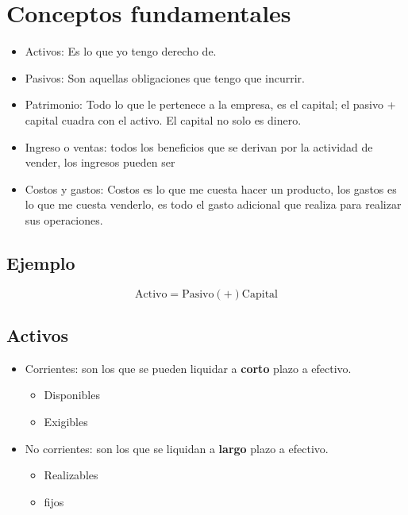 \section{Conceptos fundamentales}
\begin{itemize}
    \item Activos: Es lo que yo tengo derecho de.
    \item Pasivos: Son aquellas obligaciones que tengo que incurrir.
    \item Patrimonio: Todo lo que le pertenece a la empresa, es el capital; el pasivo + capital cuadra con el activo. El capital no solo es dinero. 
    \item Ingreso o ventas: todos los beneficios que se derivan por la actividad de vender, los ingresos pueden ser 
    \item Costos y gastos: Costos es lo que me cuesta hacer un producto, los gastos es lo que me cuesta venderlo, es todo el gasto adicional que realiza para realizar sus operaciones.
\end{itemize}

\subsection{Ejemplo}
\[
  \text{Activo} = \text{Pasivo} (+) \text{Capital} 
\]

\subsection{Activos}
\begin{itemize}
    \item Corrientes: son los que se pueden liquidar a \textbf{corto} plazo a efectivo.
        \begin{itemize}
            \item Disponibles 
            \item Exigibles
        \end{itemize}
    \item No corrientes: son los que se liquidan a \textbf{largo} plazo a efectivo. 
        \begin{itemize}
            \item Realizables
            \item fijos 
        \end{itemize}
\end{itemize}

